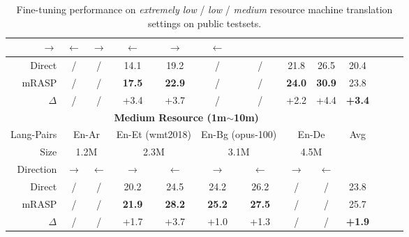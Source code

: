 \documentclass[11pt,a4paper]{article}
\newcommand{\mf}[1]{\multicolumn{2}{c}{ #1}}
\newcommand{\smf}[1]{\multicolumn{2}{c}{#1}}
\newcommand{\method}{mRASP\xspace}
\newcommand{\baseline}{Direct}
\begin{document}
\begin{table*}[htb]
\begin{center}
\begin{tabular}{rcccccccccccc}
 $\rightarrow$ &$\leftarrow$ &

 $\rightarrow$ &$\leftarrow$ &

 $\rightarrow$ &$\leftarrow$ \\




\midrule
 \baseline &
/ & / & 14.1 & 19.2 & / & / & 21.8 & 26.5 & 20.4
\\


 \method &
/ & / &  \bf 17.5 & \bf 22.9 & / & / & \bf 24.0 & \bf 30.9 & 23.8

\\

$\Delta$ &
/ & / &
+3.4 & +3.7  &
/ & / &
+2.2 & +4.4 &
\textbf{+3.4}

\\

\midrule
\midrule
&\multicolumn{7}{c}{\textbf{Medium Resource (1m$\sim$10m)}} \\
\midrule


Lang-Pairs & 
\mf{En-Ar} &
\mf{En-Et (wmt2018)} &
\mf{En-Bg (opus-100)} &
\mf{En-De} &
Avg
\\



Size &
\smf{1.2M}  & \smf{2.3M} & \smf{3.1M} & \smf{4.5M}  

\\


Direction & 
 $\rightarrow$ &$\leftarrow$ &

 $\rightarrow$ &$\leftarrow$ &

 $\rightarrow$ &$\leftarrow$ &

 $\rightarrow$ &$\leftarrow$ \\



\midrule
 \baseline &
/ & / & 20.2 & 24.5 & 24.2 & 26.2 & / & / &  23.8
\\


 \method &
/ & / & \bf 21.9 & \bf 28.2 & \bf 25.2 & \bf 27.5 & / & / & 25.7
\\

$\Delta$ &
/ & / &
+1.7 & +3.7 &
+1.0 & +1.3 &
/ & / &
\textbf{+1.9}

\\

\bottomrule
\end{tabular}
\caption{Fine-tuning performance on \emph{extremely low} / \emph{low} / \emph{medium} resource machine translation settings on public testsets.}
\label{tab:LowRpub}
\end{center}
\end{table*} 
\end{document}
